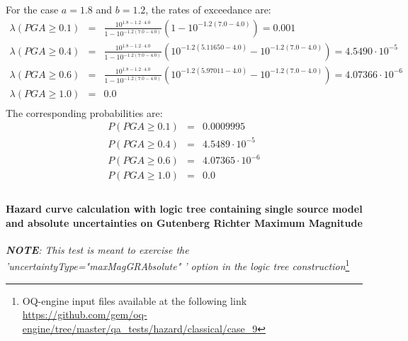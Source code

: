 For the case $a=1.8$ and $b=1.2$, the rates of exceedance are:
\begin{eqnarray}
\lambda(PGA \geq 0.1) &=& \frac{10^{1.8 - 1.2\cdot4.0}}{1 - 10^{-1.2(7.0 - 4.0)}}(1 - 10^{-1.2(7.0 - 4.0)})  = 0.001 \nonumber \\
\lambda(PGA \geq 0.4) &=& \frac{10^{1.8 - 1.2\cdot4.0}}{1 - 10^{-1.2(7.0 - 4.0)}}(10^{-1.2(5.11650-4.0)} - 10^{-1.2(7.0 - 4.0)}) = 4.5490\cdot 10^{-5} \nonumber \\
\lambda(PGA \geq 0.6) &=& \frac{10^{1.8 - 1.2\cdot4.0}}{1 - 10^{-1.2(7.0 - 4.0)}}(10^{-1.2(5.97011-4.0)} - 10^{-1.2(7.0 - 4.0)}) = 4.07366\cdot 10^{-6} \nonumber \\
\lambda(PGA \geq 1.0) &=& 0.0 \nonumber \\
\end{eqnarray}
The corresponding probabilities are:
\begin{eqnarray}
P(PGA \geq 0.1) &=& 0.0009995\nonumber \\
P(PGA \geq 0.4) &=& 4.5489\cdot 10^{-5}\nonumber \\
P(PGA \geq 0.6) &=& 4.07365\cdot 10^{-6}\nonumber \\
P(PGA \geq 1.0) &=& 0.0\nonumber \\
\end{eqnarray}
%
\clearpage
%
\paragraph{Hazard curve calculation with logic tree containing single
source model and absolute uncertainties on Gutenberg Richter Maximum Magnitude}
%
\textit{\textbf{NOTE}: This test is meant to exercise the
'uncertaintyType="maxMagGRAbsolute" ' option in the logic tree construction}\footnote{
    OQ-engine input files available at the following link
    \url{https://github.com/gem/oq-engine/tree/master/qa_tests/hazard/classical/case_9}
    }

